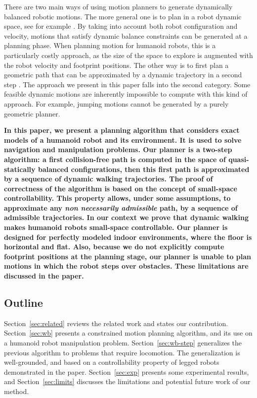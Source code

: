 \documentclass{article}
\begin{document}
There are two main ways of using motion planners to generate dynamically balanced robotic motions.
The more general one is to plan in a robot dynamic space, see for example \cite{shkolnik2011bounding}. 
By taking into account both robot
configuration and velocity, motions that satisfy dynamic balance constraints can be generated
at a planning phase. When planning motion for humanoid robots, this is a particularly costly
approach, as the size of the space to explore is augmented with the robot velocity and footprint
positions. The other way is to first plan  a geometric path that can be approximated by a
dynamic trajectory in a second step \cite{yoshida-humanoids05}. The approach we present in this paper 
falls into the second 
category. Some feasible dynamic motions are inherently impossible to compute with this kind
of approach. For example, jumping motions cannot be generated by a purely geometric planner.

\textbf{In this paper, we present a planning algorithm that considers
  exact models of a humanoid robot and its environment. It is used to
  solve navigation and manipulation problems. Our planner is a
  two-step algorithm: a first collision-free path is computed in the
  space of quasi-statically balanced configurations, then this first
  path is approximated by a sequence of dynamic walking
  trajectories. The proof of correctness of the algorithm is based on
  the concept of small-space controllability. This property allows,
  under some assumptions, to approximate any \textit{non necessarily
    admissible} path, by a sequence of admissible trajectories. In our
  context we prove that dynamic walking makes humanoid robots
  small-space controllable. Our planner is designed for perfectly
  modeled indoor environments, where the floor is horizontal and
  flat. Also, because we do not explicitly compute footprint positions
  at the planning stage, our planner is unable to plan motions in
  which the robot steps over obstacles. These limitations are
  discussed in the paper.}

\subsection{Outline}
Section~\ref{sec:related} reviews the related work and states our contribution. 
Section~\ref{sec:wb} presents a constrained motion planning algorithm, and its
use on a humanoid robot manipulation problem. Section~\ref{sec:wb-step} generalizes
the previous algorithm to problems that require locomotion. The generalization is
well-grounded, and
based on a controllability property of legged robots demonstrated in the paper. 
Section~\ref{sec:exp} presents some experimental results, and 
Section~\ref{sec:limits} discusses the limitations and potential future work of our
method.
\end{document}
